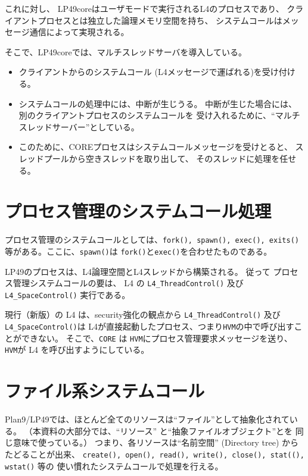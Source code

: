 これに対し、
LP49coreはユーザモードで実行されるL4のプロセスであり、
クライアントプロセスとは独立した論理メモリ空間を持ち、
システムコールはメッセージ通信によって実現される。

そこで、LP49coreでは、マルチスレッドサーバを導入している。

\begin{itemize}
\item  クライアントからのシステムコール (L4メッセージで運ばれる)を受け付ける。
\item  システムコールの処理中には、中断が生じうる。
       中断が生じた場合には、別のクライアントプロセスのシステムコールを
       受け入れるために、``マルチスレッドサーバー''としている。
\item  このために、COREプロセスはシステムコールメッセージを受けとると、
       スレッドプールから空きスレッドを取り出して、
       そのスレッドに処理を任せる。
\end{itemize}



\section{ プロセス管理のシステムコール処理}

プロセス管理のシステムコールとしては、{\tt fork(), spawn(), exec(), exits()} 
等がある。ここに、{\tt spawn()}は {\tt fork()}と{\tt exec()}を合わせたものである。

LP49のプロセスは、L4論理空間とL4スレッドから構築される。
従って プロセス管理システムコールの要は、 
L4 の \verb|L4_ThreadControl()| 及び\verb|L4_SpaceControl()| 実行である。

現行（新版）の L4 は、security強化の観点から
 \verb|L4_ThreadControl()| 及び\verb|L4_SpaceControl()|は
L4が直接起動したプロセス、つまり{\tt HVM}の中で呼び出すことができない。
そこで、{\tt CORE} は {\tt HVM}にプロセス管理要求メッセージを送り、
{\tt  HVM}が L4 を呼び出すようにしている。


\section{ ファイル系システムコール}

Plan9/LP49では、ほとんど全てのリソースは``ファイル''として抽象化されている。
（本資料の大部分では、``リソース'' と``抽象ファイルオブジェクト''とを
同じ意味で使っている。）
つまり、各リソースは``名前空間'' (Directory tree) からたどることが出来、
{\tt create(), open(), read(), write(), close(), stat((), wstat()} 等の
使い慣れたシステムコールで処理を行える。

